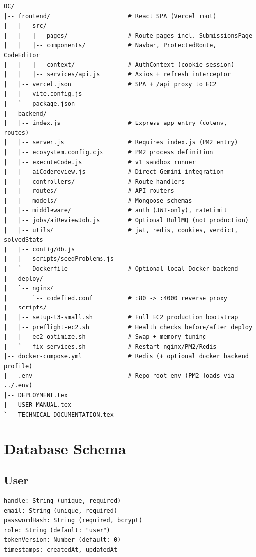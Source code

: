 \documentclass[11pt,a4paper]{article}
\begin{document}
\begin{lstlisting}[style=terminal]
OC/
|-- frontend/                      # React SPA (Vercel root)
|   |-- src/
|   |   |-- pages/                 # Route pages incl. SubmissionsPage
|   |   |-- components/            # Navbar, ProtectedRoute, CodeEditor
|   |   |-- context/               # AuthContext (cookie session)
|   |   |-- services/api.js        # Axios + refresh interceptor
|   |-- vercel.json                # SPA + /api proxy to EC2
|   |-- vite.config.js
|   `-- package.json
|-- backend/
|   |-- index.js                   # Express app entry (dotenv, routes)
|   |-- server.js                  # Requires index.js (PM2 entry)
|   |-- ecosystem.config.cjs       # PM2 process definition
|   |-- executeCode.js             # v1 sandbox runner
|   |-- aiCodereview.js            # Direct Gemini integration
|   |-- controllers/               # Route handlers
|   |-- routes/                    # API routers
|   |-- models/                    # Mongoose schemas
|   |-- middleware/                # auth (JWT-only), rateLimit
|   |-- jobs/aiReviewJob.js        # Optional BullMQ (not production)
|   |-- utils/                     # jwt, redis, cookies, verdict, solvedStats
|   |-- config/db.js
|   |-- scripts/seedProblems.js
|   `-- Dockerfile                 # Optional local Docker backend
|-- deploy/
|   `-- nginx/
|       `-- codefied.conf          # :80 -> :4000 reverse proxy
|-- scripts/
|   |-- setup-t3-small.sh          # Full EC2 production bootstrap
|   |-- preflight-ec2.sh           # Health checks before/after deploy
|   |-- ec2-optimize.sh            # Swap + memory tuning
|   `-- fix-services.sh            # Restart nginx/PM2/Redis
|-- docker-compose.yml             # Redis (+ optional docker backend profile)
|-- .env                           # Repo-root env (PM2 loads via ../.env)
|-- DEPLOYMENT.tex
|-- USER_MANUAL.tex
`-- TECHNICAL_DOCUMENTATION.tex
\end{lstlisting}

\section{Database Schema}

\subsection{User}
\begin{lstlisting}[style=envfile]
handle: String (unique, required)
email: String (unique, required)
passwordHash: String (required, bcrypt)
role: String (default: "user")
tokenVersion: Number (default: 0)
timestamps: createdAt, updatedAt
\end{lstlisting}
\end{document}
